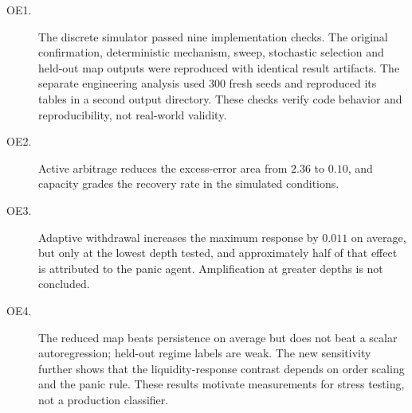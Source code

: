 \begin{description}
  \item[OE1.] The discrete simulator passed nine implementation checks. The original confirmation, deterministic mechanism, sweep, stochastic selection and held-out map outputs were reproduced with identical result artifacts. The separate engineering analysis used 300 fresh seeds and reproduced its tables in a second output directory. These checks verify code behavior and reproducibility, not real-world validity.
  \item[OE2.] Active arbitrage reduces the excess-error area from $2.36$ to $0.10$, and capacity grades the recovery rate in the simulated conditions.
  \item[OE3.] Adaptive withdrawal increases the maximum response by $0.011$ on average, but only at the lowest depth tested, and approximately half of that effect is attributed to the panic agent. Amplification at greater depths is not concluded.
  \item[OE4.] The reduced map beats persistence on average but does not beat a scalar autoregression; held-out regime labels are weak. The new sensitivity further shows that the liquidity-response contrast depends on order scaling and the panic rule. These results motivate measurements for stress testing, not a production classifier.
\end{description}

